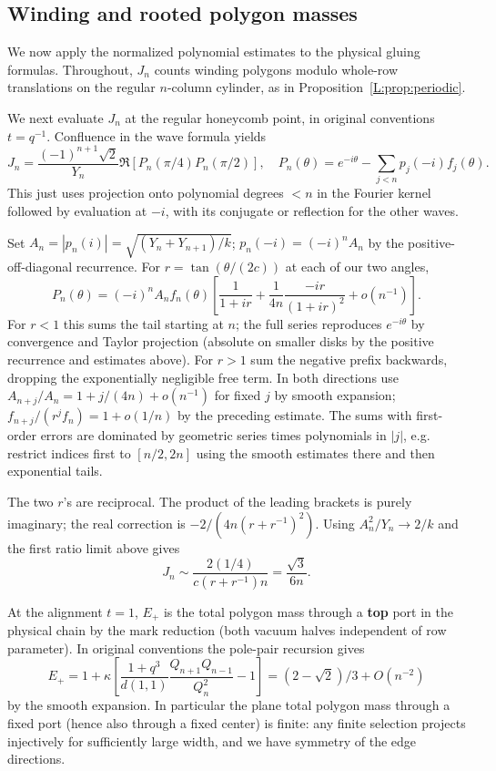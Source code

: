 \subsection{Winding and rooted polygon masses}
We now apply the normalized polynomial estimates to the physical gluing
formulas. Throughout, $J_n$ counts winding polygons modulo whole-row
translations on the regular $n$-column cylinder, as in
Proposition~\ref{L:prop:periodic}.

We next evaluate \(J_n\) at the regular honeycomb point, in original conventions \(t=q^{-1}\). Confluence in the wave formula yields
\[
 J_n=\frac{(-1)^{n+1}\sqrt2}{Y_n}\Re[P_n(\pi/4)P_n(\pi/2)],\quad
 P_n(\theta)=e^{-i\theta}-\sum_{j<n}p_j(-i) f_j(\theta).
\]
This just uses projection onto polynomial degrees \(<n\) in the Fourier kernel followed by evaluation at \(-i\), with its conjugate or reflection for the other waves.

Set \(A_n=|p_n(i)|=\sqrt{(Y_n+Y_{n+1})/k}\); \(p_n(-i)=(-i)^n A_n\) by the positive-off-diagonal recurrence. For \(r=\tan(\theta/(2c))\) at each of our two angles,
\[
 P_n(\theta)=(-i)^n A_n f_n(\theta)
   \left[\frac1{1+i r}+\frac1{4n}\frac{-i r}{(1+i r)^2}+o(n^{-1})\right].
\]
For \(r<1\) this sums the tail starting at \(n\); the full series reproduces \(e^{-i\theta}\) by convergence and Taylor projection (absolute on smaller disks by the positive recurrence and estimates above). For \(r>1\) sum the negative prefix backwards, dropping the exponentially negligible free term. In both directions use \(A_{n+j}/A_n=1+j/(4n)+o(n^{-1})\) for fixed \(j\) by smooth expansion; \(f_{n+j}/(r^j f_n)=1+o(1/n)\) by the preceding estimate. The sums with first-order errors are dominated by geometric series times polynomials in \(|j|\), e.g. restrict indices first to \([n/2,2n]\) using the smooth estimates there and then exponential tails.

The two \(r\)'s are reciprocal. The product of the leading brackets is purely imaginary; the real correction is \(-2/(4n(r+r^{-1})^2)\). Using \(A_n^2/Y_n\to 2/k\) and the first ratio limit above gives
\begin{equation}\label{L:eq:calibrated-winding}
 J_n\sim \frac{2(1/4)}{c(r+r^{-1})n}=\frac{\sqrt3}{6n}.
\end{equation}

At the alignment \(t=1\), \(E_+\) is the total polygon mass through a \textbf{top} port in the physical chain by the mark reduction (both vacuum halves independent of row parameter). In original conventions the pole-pair recursion gives
\begin{equation}\label{L:eq:top-port}
 E_+=1+\kappa\left[\frac{1+q^3}{d(1,1)}\frac{Q_{n+1}Q_{n-1}}{Q_n^2}-1\right]
       = (2-\sqrt2)/3+O(n^{-2})
\end{equation}
by the smooth expansion. In particular the plane total polygon mass through a fixed port (hence also through a fixed center) is finite: any finite selection projects injectively for sufficiently large width, and we have symmetry of the edge directions.

